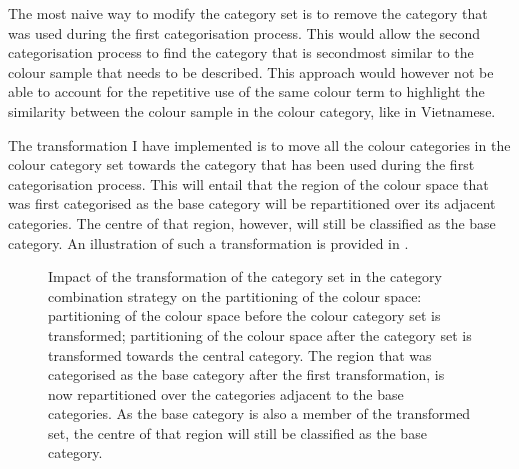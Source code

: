 The most naive way to modify the category set is to remove the
category that was used during the first categorisation process. This
would allow the second categorisation process to find the category
that is secondmost similar to the colour sample that needs to be
described. This approach would however not be able to account for 
the repetitive use of the same colour term to highlight the similarity
between the colour sample in the colour category, like in Vietnamese.

The transformation I have implemented is to move all the colour
categories in the colour category set towards the category that has
been used during the first categorisation process. This will entail
that the region of the colour space that was first categorised as the
base category will be repartitioned over its adjacent categories. The
centre of that region, however, will still be classified as the base
category. An illustration of such a transformation is provided in
.

\begin{figure}[htbp]
\centering
{}
\caption[Impact of the transformation of the category set in the
category combination strategy on the partitioning of the colour
space]{Impact of the transformation of the category set in the
  category combination strategy on the partitioning of the
  colour space: 
  partitioning of the colour space before the colour category set is
  transformed;  partitioning of
  the colour space after the category set is transformed towards the
  central category. The region that was categorised as
  the base category after the first transformation, is now repartitioned over the categories adjacent
  to the base categories. As the base category is also a member of the
  transformed set, the centre of that region will still be classified
  as the base category.}
\label{f:ccs-semantics-transformation}
\end{figure}

